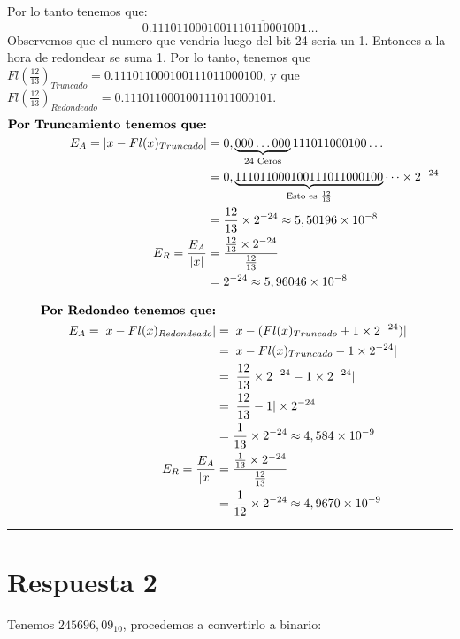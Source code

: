 \documentclass{article}
\begin{document}
Por lo tanto tenemos que:
\begin{equation*}
	0.111011000100\overline{111011000100}\textbf{1}\dots
\end{equation*}
Observemos que el numero que vendria luego del bit 24 seria un 1. Entonces a la hora de redondear se suma 1.
Por lo tanto, tenemos que $Fl(\frac{12}{13})_{Truncado} = 0.111011000100111011000100$, 
y que $Fl(\frac{12}{13})_{Redondeado} = 0.111011000100111011000101$.
\begin{align*}
	\text{\textbf{Por Truncamiento tenemos que:}} \\
	E_{A} = |x - Fl(x)_{Truncado}| & = 0, \underbrace{000\dots000}_\text{24 Ceros}111011000100\dots \\
	& = 0,\underbrace{111011000100111011000100}_\text{Esto es $\frac{12}{13}$}\dots \times 2^{-24} \\
	& = \frac{12}{13} \times 2^{-24} \approx 5,50196 \times 10^{-8} \\
	E_{R} = \frac{E_{A}}{|x|} & = \frac{\frac{12}{13} \times 2^{-24}}{\frac{12}{13}} \\
	& = 2^{-24} \approx 5,96046 \times 10^{-8}
\end{align*}

\begin{align*}
\text{\textbf{Por Redondeo tenemos que:}} \\
E_{A} = |x - Fl(x)_{Redondeado}| & = |x - (Fl(x)_{Truncado} + 1 \times 2^{-24})| \\
& = |x - Fl(x)_{Truncado} - 1 \times 2^{-24}| \\
& = |\frac{12}{13} \times 2^{-24} - 1 \times 2^{-24}|  \\
& = |\frac{12}{13} - 1| \times 2^{-24} \\
& = \frac{1}{13} \times 2^{-24} \approx 4,584 \times 10^{-9} \\
E_{R} = \frac{E_{A}}{|x|} & = \frac{\frac{1}{13} \times 2^{-24}}{\frac{12}{13}} \\
& = \frac{1}{12} \times 2^{-24} \approx 4,9670 \times 10^{-9}
\end{align*}


\hrule
\section*{Respuesta 2}
Tenemos $245696,09_{10}$, procedemos a convertirlo a binario:
\end{document}
